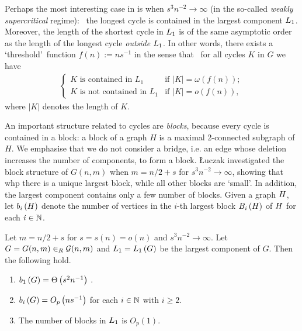 Perhaps the most interesting case in  is when $s^3 n^{-2} \to \infty$ (in the so-called {\em weakly supercritical} regime): \whp\ the longest cycle is contained in the largest component $L_1$. 
Moreover, the length of the shortest cycle in $L_1$ is of the same asymptotic order as the length of the longest cycle {\em outside} $L_1$. In other words, there exists a \lq threshold\rq\ function $f(n):=n s^{-1}$ in the sense that \whp\ for all cycles $K$ in $G$ we have
\begin{align}\label{CBequ:threshold}
\begin{cases}
K \text{ is contained in } L_1 & \text{if } |K|=\omega\left(f(n)\right); \\[0.1cm]
K \text{ is not contained in } L_1 & \text{if } |K|=o\left(f(n)\right), 
\end{cases}
\end{align}
where $|K|$ denotes the length of $K$.

An important structure related to cycles are {\em blocks}, because every cycle is contained in a block: a block of a graph $H$ is a maximal 2-connected subgraph of $H$. We emphasise that we do not consider a bridge, i.e. an edge whose deletion increases the number of components, to form a block. {\L}uczak \cite{Luczak1991b} investigated the block structure of $G(n,m)$ when $m=n/2+s$ for $s^3 n^{-2}\to \infty$, showing that whp there is a unique largest block, while all other blocks are \lq small\rq. In addition, the largest component contains only a few number of blocks. Given a graph $H$, let $b_{i}\left(H\right)$ denote the number of vertices in the $i$-th largest block $B_{i}\left(H\right)$ of $H$ for each $i\in \mathbb{N}$.

\begin{thm}\label{CBthm:block_luczak}
	Let $m=n/2+s$ for $s=s(n)=o\left(n\right)$ and $s^3 n^{-2} \to \infty$. 
	Let $G=G(n,m)\in_R \mathcal G(n,m)$ and $L_1=L_1\left(G\right)$ be the largest component of $G$. Then the following hold.
	\begin{enumerate}
		\item \label{CBthm:block_luczaka}
		$b_{1}\left(G\right)=\Theta\left(s^2 n^{-1}\right)$ \whp.
		\item \label{CBthm:block_luczakb}
		$b_{i}\left(G\right)=O_p\left(n s^{-1}\right)$ for each $i\in \mathbb{N}$ with $i\geq 2$.
		\item \label{CBthm:block_luczakc}
		The number of blocks in $L_1$ is $O_p(1)$.
	\end{enumerate}
\end{thm}

